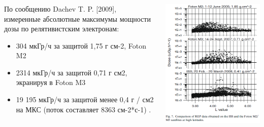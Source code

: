 \documentclass[t, aspectratio=43]{beamer}
\begin{document}
\begin{frame}
\frametitle{\insertsection} 

\begin{columns}[T]
\begin{column}{.5\textwidth}
{\tiny 
По сообщению Dachev T. P. [2009], измеренные абсолютные максимумы мощности дозы	по релятивистским электронам:
\begin{itemize}
	\item  304 мкГр/ч за защитой  1,75 г см-2,  Foton M2
	 \item  2314 мкГр/ч за защитой   0,71 г см2, экранируя в Foton M3 
	 \item  19 195 мкГр/ч за защитой менее 0,4 г / см2 на МКС (поток составляет 8363 см-2*с-1) .
\end{itemize}
}
\end{column}
\begin{column}{.5\textwidth}
	\begin{center}
		\includegraphics[width=1\linewidth]{images/dachevrep}
	\end{center}
\end{column}
\end{columns}
\end{frame}
\end{document}
